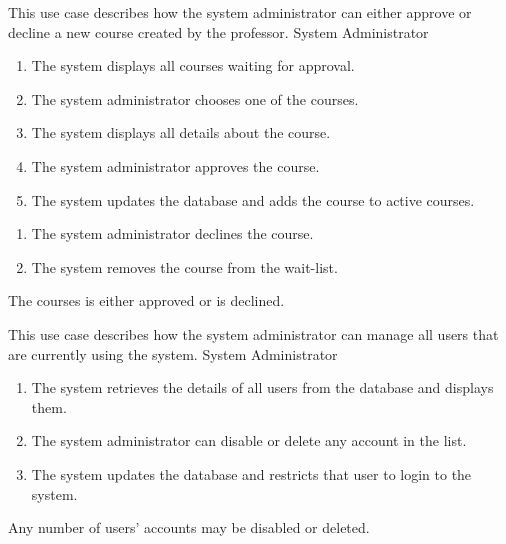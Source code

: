 \documentclass[12pt, a4]{report}
\begin{document}

\newpage
{}
{ %
This use case describes how the system administrator can either approve or decline a new course created by the professor.
}
{ %
System Administrator
}
{ %
\begin{enumerate}
    \item The system displays all courses waiting for approval.
    \item The system administrator chooses one of the courses.
    \item The system displays all details about the course.
    \item The system administrator approves the course.
    \item The system updates the database and adds the course to active courses.
\end{enumerate}
}
{ %
\begin{enumerate}
    \item The system administrator declines the course.
    \item The system removes the course from the wait-list.
\end{enumerate}
}
{ %
}
{ %
The courses is either approved or is declined.
}
{ %
}
{ %
}


{ %
This use case describes how the system administrator can manage all users that are currently using the system.
}
{ %
System Administrator
}
{ %
\begin{enumerate}
    \item The system retrieves the details of all users from the database and displays them.
    \item The system administrator can disable or delete any account in the list.
    \item The system updates the database and restricts that user to login to the system.
\end{enumerate}
}
{ %
}
{ %
}
{ %
Any number of users' accounts may be disabled or deleted.
}
{ %
}
{ %
}

\end{document}
